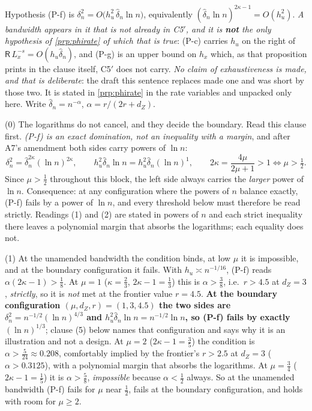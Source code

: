\begin{remark}\label{rem:h6bandwidth}
Hypothesis (P-f) is $\delta_n^{2}=O\big(h_u^{2}\,\hat\delta_n\ln n\big)$, equivalently
$(\hat\delta_n\ln n)^{2\kappa-1}=O(h_u^{2})$. \emph{A bandwidth appears in it that is not already in
C5$'$, and it is \textbf{not} the only hypothesis of \cref{prp:phirate} of which that is true}:
(P-c) carries $h_u$ on the right of $\mathsf R\,L_x^{-s}=O(h_u\hat\delta_n)$, and (P-g) is an upper
bound on $h_x$ which, as that proposition prints in the clause itself, C5$'$ does not carry.
\emph{No claim of exhaustiveness is made, and that is deliberate}: the draft this sentence replaces
made one and was short by those two. It is stated in \cref{prp:phirate} in the rate
variables and unpacked only here. Write $\hat\delta_n=n^{-\alpha}$, $\alpha=r/(2r+d_Z)$.

(0) The logarithms do not cancel, and they decide the boundary. Read this clause first.
\emph{(P-f) is an exact domination, not an inequality with a margin}, and after A7's amendment both
sides carry powers of $\ln n$:
\[
\delta_n^{2}=\hat\delta_n^{2\kappa}(\ln n)^{2\kappa},
\qquad
h_u^{2}\hat\delta_n\ln n=h_u^{2}\hat\delta_n(\ln n)^{1},
\qquad
2\kappa=\frac{4\mu}{2\mu+1}>1\iff\mu>\tfrac12 .
\]
Since $\mu>\tfrac12$ throughout this block, the left side always carries the \emph{larger} power of
$\ln n$. Consequence: at any configuration where the powers of $n$ balance exactly, (P-f) fails
by a power of $\ln n$, and every threshold below must therefore be read strictly. Readings (1) and (2)
are stated in powers of $n$ and each strict inequality there leaves a polynomial margin that absorbs
the logarithms; each equality does not.

(1) At the unamended bandwidth the condition binds, at low $\mu$ it is impossible, and at the
boundary configuration it fails. With $h_u\asymp n^{-1/16}$, (P-f) reads
$\alpha(2\kappa-1)>\tfrac18$. At $\mu=1$ ($\kappa=\tfrac23$, $2\kappa-1=\tfrac13$) this is
$\alpha>\tfrac38$, i.e.\ $r>4.5$ at $d_Z=3$, \emph{strictly}, so it is \emph{not} met at the
frontier value $r=4.5$. \textbf{At the boundary configuration $(\mu,d_Z,r)=(1,3,4.5)$ the two sides
are $\delta_n^{2}=n^{-1/2}(\ln n)^{4/3}$ and $h_u^{2}\hat\delta_n\ln n=n^{-1/2}\ln n$, so (P-f) fails
by exactly $(\ln n)^{1/3}$}; clause (5) below names that configuration and says why it is an
illustration and not a design. At $\mu=2$ ($2\kappa-1=\tfrac35$) the condition is
$\alpha>\tfrac5{24}\approx0.208$, comfortably implied by the frontier's $r>2.5$ at $d_Z=3$
($\alpha>0.3125$), with a polynomial margin that absorbs the logarithms. At $\mu=\tfrac34$
($2\kappa-1=\tfrac15$) it is $\alpha>\tfrac58$, \emph{impossible} because $\alpha<\tfrac12$ always.
So at the unamended bandwidth (P-f) fails for $\mu$ near $\tfrac12$, fails at the boundary
configuration, and holds with room for $\mu\ge2$.


\end{remark}
